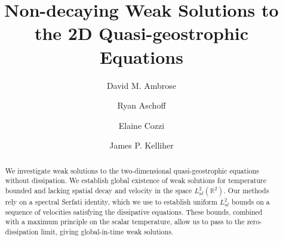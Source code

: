 \documentclass[11pt,reqno,xcolor=svgnames]{amsart}
\theoremstyle{plain}
\theoremstyle{definition}
\theoremstyle{plain}
\theoremstyle{remark}
\begin{document}


\raggedbottom




\title
    [Weak Solutions to SQG]
    {Non-decaying Weak Solutions to the 2D Quasi-geostrophic Equations}






\author{David M. Ambrose}
\address{Department of Mathematics, Drexel University}
\curraddr{}

\author{Ryan Aschoff}
\address{Software Development, Google}
\curraddr{}


\author{Elaine Cozzi}
\address{Department of Mathematics, Oregon State University}
\curraddr{}

\author{James P. Kelliher}
\address{Department of Mathematics, University of California, Riverside}
\curraddr{}



\date{} %




\begin{abstract}
We investigate weak solutions to the two-dimensional quasi-geostrophic equations without dissipation.  We establish global existence of weak solutions for temperature bounded and lacking spatial decay and velocity in the space $L^2_{ul}(\mathbb{R}^2)$.  Our methods rely on a spectral Serfati identity, which we use to establish uniform $L^2_{ul}$ bounds on a sequence of velocities satisfying the dissipative equations.  These bounds, combined with a maximum principle on the scalar temperature, allow us to pass to the zero-dissipation limit, giving global-in-time weak solutions.            
\end{abstract}
\end{document}
